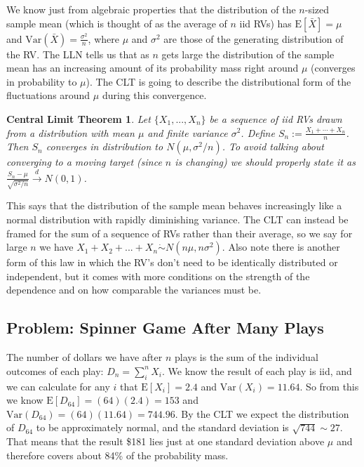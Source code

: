 We know just from algebraic properties that the distribution of the $n$-sized sample mean (which is thought of as the average of $n$ iid RVs) has $\mathrm{E}[\bar{X}] = \mu$ and  $\mathrm{Var}(\bar{X}) = \frac{\sigma^2}{n}$, where $\mu$ and $\sigma^2$ are those of the generating distribution of the RV. The LLN tells us that as $n$ gets large the distribution of the sample mean has an increasing amount of its probability mass right around $\mu$ (converges in probability to $\mu$). The CLT is going to describe the distributional form of the fluctuations around $\mu$ during this convergence.

\theoremstyle{plain}
\newtheorem*{CLT}{Central Limit Theorem}
\begin{CLT}
Let $\{X_1, ..., X_n\}$ be a sequence of iid RVs drawn from a distribution with mean $\mu$ and finite variance $\sigma^2$. Define $S_n := \frac{X_1+\cdots+X_n}{n}$. Then $S_n$ converges in distribution to $N(\mu,\sigma^2/n)$. To avoid talking about converging to a moving target (since $n$ is changing) we should properly state it as $\frac{S_n - \mu}{\sqrt{\sigma^2/n}}\xrightarrow{d}N(0,1)$.
\end{CLT}
This says that the distribution of the sample mean behaves increasingly like a normal distribution with rapidly diminishing variance. The CLT can instead be framed for the sum of a sequence of RVs rather than their average, so we say for large $n$ we have $X_1+X_2+...+X_n \dot{\sim} N(n\mu, n\sigma^2)$. Also note there is another form of this law in which the RV's don't need to be identically distributed or independent, but it comes with more conditions on the strength of the dependence and on how comparable the variances must be.



\subsection{Problem: Spinner Game After Many Plays}
The number of dollars we have after $n$ plays is the sum of the individual outcomes of each play: $D_n = \sum_i^nX_i$. We know the result of each play is iid, and we can calculate for any $i$ that $\mathrm{E}[X_i]=2.4$ and $\mathrm{Var}(X_i) = 11.64 $.  So from this we know $\mathrm{E}[D_{64}] = (64)(2.4) = 153$ and $\mathrm{Var}(D_{64}) = (64)(11.64) = 744.96$. By the CLT we expect the distribution of $D_{64}$ to be approximately normal, and the standard deviation is $\sqrt{744} \sim 27$. That means that the result \$181 lies just at one standard deviation above $\mu$ and therefore covers about 84\% of the probability mass. 



